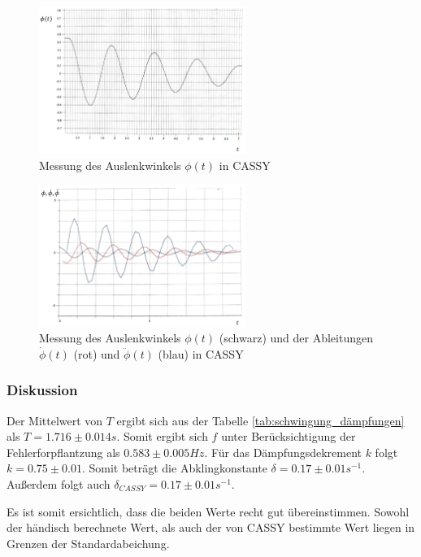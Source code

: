 \documentclass{article}
\begin{document}
\begin{figure}[H]
    \centering
    \includegraphics[width=0.6\textwidth]{bilder/eigenfreq_messdaten.png}
    \caption{Messung des Auslenkwinkels $\phi(t)$ in CASSY}
    \label{fig:eigenfreq_messdaten}
\end{figure}

\begin{figure}[H]
    \centering
    \includegraphics[width=0.6\textwidth]{bilder/eigenfreq_ableitungen_messdaten.png}
    \caption{Messung des Auslenkwinkels $\phi(t)$ (schwarz) und der Ableitungen $\dot\phi(t)$ (rot) und $\ddot\phi(t)$ (blau) in CASSY}
    \label{fig:eigenfreq_abl_messdaten}
\end{figure}

\subsubsection{Diskussion}
Der Mittelwert von $T$ ergibt sich aus der Tabelle \ref{tab:schwingung_dämpfungen} als $T = 1.716 \pm 0.014s$. Somit ergibt sich $f$ unter Berücksichtigung der
Fehlerforpflantzung als $0.583 \pm 0.005Hz$. Für das Dämpfungsdekrement $k$ folgt $k = 0.75 \pm 0.01$. Somit beträgt die Abklingkonstante $\delta = 0.17 \pm 0.01s^{-1}$.
Außerdem folgt auch $\delta_{CASSY} = 0.17 \pm 0.01s^{-1}$.

Es ist somit ersichtlich, dass die beiden Werte recht gut übereinstimmen. Sowohl der händisch berechnete Wert, als auch der von CASSY bestimmte Wert liegen in Grenzen der
Standardabeichung.
\end{document}
